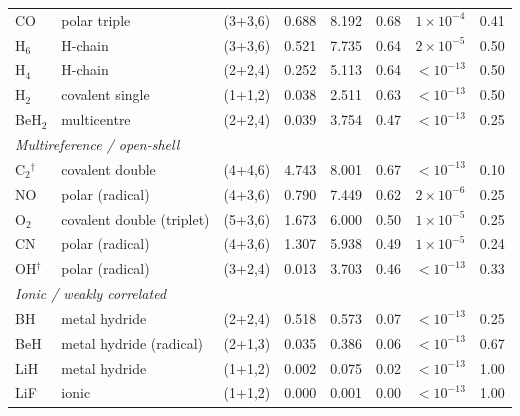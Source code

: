 \begin{table}[t]
\begin{tabular}{llcccccc}
CO & polar triple & (3+3,6) & 0.688 & 8.192 & 0.68 & $1\times10^{-4}$ & 0.41 \\
H$_6$ & H-chain & (3+3,6) & 0.521 & 7.735 & 0.64 & $2\times10^{-5}$ & 0.50 \\
H$_4$ & H-chain & (2+2,4) & 0.252 & 5.113 & 0.64 & $<\!10^{-13}$ & 0.50 \\
H$_2$ & covalent single & (1+1,2) & 0.038 & 2.511 & 0.63 & $<\!10^{-13}$ & 0.50 \\
BeH$_2$ & multicentre & (2+2,4) & 0.039 & 3.754 & 0.47 & $<\!10^{-13}$ & 0.25 \\
\multicolumn{8}{l}{\emph{Multireference / open-shell}}\\
C$_2$$^{\dagger}$ & covalent double & (4+4,6) & 4.743 & 8.001 & 0.67 & $<\!10^{-13}$ & 0.10 \\
NO & polar (radical) & (4+3,6) & 0.790 & 7.449 & 0.62 & $2\times10^{-6}$ & 0.25 \\
O$_2$ & covalent double (triplet) & (5+3,6) & 1.673 & 6.000 & 0.50 & $1\times10^{-5}$ & 0.25 \\
CN & polar (radical) & (4+3,6) & 1.307 & 5.938 & 0.49 & $1\times10^{-5}$ & 0.24 \\
OH$^{\dagger}$ & polar (radical) & (3+2,4) & 0.013 & 3.703 & 0.46 & $<\!10^{-13}$ & 0.33 \\
\multicolumn{8}{l}{\emph{Ionic / weakly correlated}}\\
BH & metal hydride & (2+2,4) & 0.518 & 0.573 & 0.07 & $<\!10^{-13}$ & 0.25 \\
BeH & metal hydride (radical) & (2+1,3) & 0.035 & 0.386 & 0.06 & $<\!10^{-13}$ & 0.67 \\
LiH & metal hydride & (1+1,2) & 0.002 & 0.075 & 0.02 & $<\!10^{-13}$ & 1.00 \\
LiF & ionic & (1+1,2) & 0.000 & 0.001 & 0.00 & $<\!10^{-13}$ & 1.00 \\
\hline\hline\end{tabular}
\end{table}
